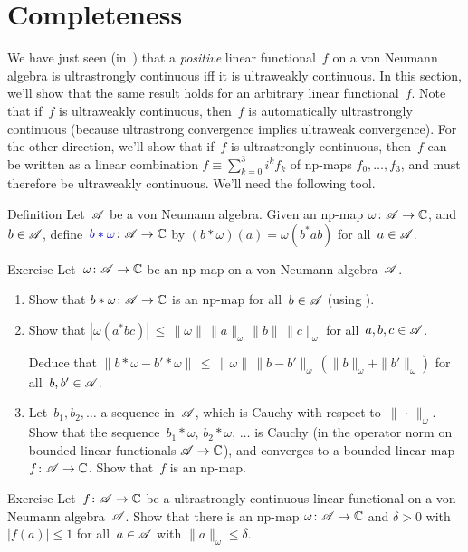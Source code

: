 \documentclass[a]{subfiles}
\begin{document}
\section{Completeness}
\begin{parsec}%
\begin{point}%
	We have just seen (in~)
	that a \emph{positive} linear functional~$f$
on a von Neumann algebra 
is ultrastrongly continuous iff it is ultraweakly continuous.
In this section, we'll show that the same result holds
for an arbitrary linear functional~$f$.
Note that if~$f$ is ultraweakly continuous,
then~$f$ is automatically ultrastrongly continuous
(because ultrastrong convergence implies ultraweak convergence).
For the other direction,
we'll show that if~$f$ is ultrastrongly continuous,
then~$f$ can be written as a linear combination
$f\equiv \sum_{k=0}^3 i^k f_k$
of np-maps $f_0,\dotsc,f_3$,
and must therefore be ultraweakly continuous.
We'll need the following tool.
\end{point}
\begin{point}[bstaromega]{Definition}%
Let~$\mathscr{A}$ be a von Neumann algebra.
Given an np-map $\omega\colon \mathscr{A}\to\mathbb{C}$,
and~$b\in \mathscr{A}$,
define~$\Define{b*\omega}\colon \scrA\to \C$ by
$(b*\omega)(a)=\omega(b^*ab)$ for all~$a\in \mathscr{A}$.
\end{point}
\begin{point}{Exercise}%
Let~$\omega\colon \mathscr{A}\to \mathbb{C}$ be an np-map on a von Neumann algebra~$\mathscr{A}$.
\begin{enumerate}
\item
Show that $b*\omega\colon \mathscr{A}\to\mathbb{C}$
is an np-map for all~$b\in \mathscr{A}$
(using \TODO{}).
\item
Show that $\left|\omega(a^*bc)\right| 
\,\leq\, \|\omega\|\,\|a\|_\omega\, \|b\|\, \|c\|_\omega$
for all~$a,b,c\in\mathscr{A}$.

Deduce that $\| b*\omega - b'*\omega\|
\,\leq\, \|\omega\| \,\|b-b'\|_\omega\, (\|b\|_\omega + \|b'\|_\omega)$
for all~$b,b'\in\mathscr{A}$.

\item
Let~$b_1,b_2,\dotsc$  a sequence in~$\mathscr{A}$,
which is Cauchy with respect to~$\|\,\cdot\,\|_\omega$.
Show that the sequence~$b_1*\omega,\,b_2*\omega,\,\dotsc$ 
is Cauchy (in the operator norm
on bounded linear functionals $\mathscr{A}\to\mathbb{C}$),
and converges to a bounded linear map~$f\colon \mathscr{A}\to\mathbb{C}$.
Show that~$f$ is an np-map.
\end{enumerate}
\end{point}
\begin{point}{Exercise}%
Let~$f\colon \mathscr{A}\to \mathbb{C}$ be a ultrastrongly continuous linear
functional on a von Neumann algebra~$\mathscr{A}$.
Show that there is an np-map
$\omega\colon \mathscr{A}\to \mathbb{C}$
and $\delta>0$
with $\left|f(a)\right|\leq 1$
for all~$a\in\mathscr{A}$ with $\|a\|_\omega \leq \delta$.


\end{point}
\end{parsec}
\end{document}

